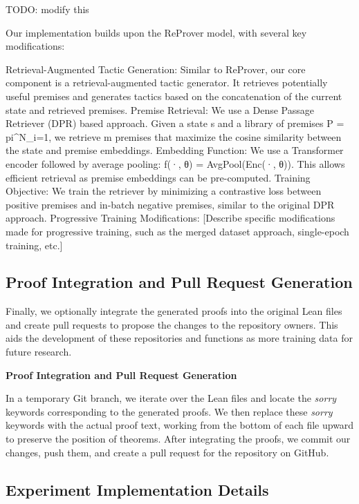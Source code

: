 \documentclass{article} %
\begin{document}
TODO: modify this


Our implementation builds upon the ReProver model, with several key modifications:

Retrieval-Augmented Tactic Generation: Similar to ReProver, our core component is a retrieval-augmented tactic generator. It retrieves potentially useful premises and generates tactics based on the concatenation of the current state and retrieved premises.
Premise Retrieval: We use a Dense Passage Retriever (DPR) based approach. Given a state s and a library of premises P = {pi}^N_{i=1}, we retrieve m premises that maximize the cosine similarity between the state and premise embeddings.
Embedding Function: We use a Transformer encoder followed by average pooling: f(·, θ) = AvgPool(Enc(·, θ)). This allows efficient retrieval as premise embeddings can be pre-computed.
Training Objective: We train the retriever by minimizing a contrastive loss between positive premises and in-batch negative premises, similar to the original DPR approach.
Progressive Training Modifications: [Describe specific modifications made for progressive training, such as the merged dataset approach, single-epoch training, etc.]


\subsection{Proof Integration and Pull Request Generation}

Finally, we optionally integrate the generated proofs into the original Lean files and create pull requests to propose the changes to the repository owners. This aids the development of these repositories and functions as more training data for future research.


\textbf{Proof Integration and Pull Request Generation}

In a temporary Git branch, we iterate over the Lean files and locate the  \textit{sorry} keywords corresponding to the generated proofs. We then replace these  \textit{sorry} keywords with the actual proof text, working from the bottom of each file upward to preserve the position of theorems. After integrating the proofs, we commit our changes, push them, and create a pull request for the repository on GitHub.

\subsection{Experiment Implementation Details}
\end{document}
